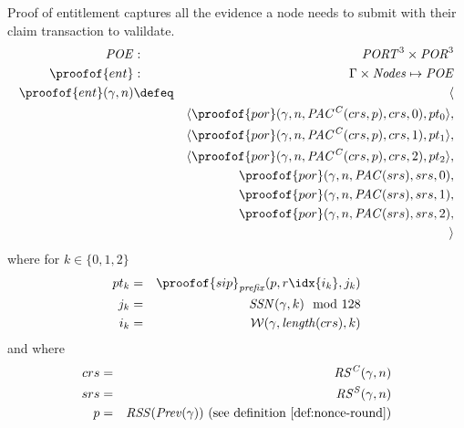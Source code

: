 \begin{definition}
\label{def:poe}
Proof of entitlement captures all the evidence a node needs to submit with their claim transaction to valildate. 
%
\begin{eqnarray}
\mathit{POE}&:&\mathit{PORT}^3\times\mathit{POR}^3\\
\proofof{ent}&:&\Gamma\times\mathit{Nodes}\mapsto\mathit{POE}\\
\proofof{ent}(\gamma,n)&\defeq&\langle\\
&&\langle\proofof{por}(\gamma,n,\mathit{PAC^C}(crs,p), crs,0),pt_0\rangle,\\
&&\langle\proofof{por}(\gamma,n,\mathit{PAC^C}(crs,p),crs,1),pt_1\rangle,\\
&&\langle\proofof{por}(\gamma,n,\mathit{PAC^C}(crs,p),crs,2),pt_2\rangle,\\
&&\proofof{por}(\gamma,n,\mathit{PAC}(srs),srs,0),\\
&&\proofof{por}(\gamma,n,\mathit{PAC}(srs),srs,1),\\
&&\proofof{por}(\gamma,n,\mathit{PAC}(srs),srs,2),\\
&&\rangle
\end{eqnarray}
where for $k\in\{0,1,2\}$
\begin{eqnarray}
pt_k&=& {\proofof{sip}_\mathit{prefix}}(p,r\idx{i_k},j_k)\\
j_k & = & \mathit{SSN}(\gamma,k)\mod 128\\
i_k & = & \mathcal{W}(\gamma,\mathit{length}(crs),k)
\end{eqnarray}
and where 
\begin{eqnarray}
crs& = & \mathit{RS^C}(\gamma, n)\\
srs & = & \mathit{RS^S}(\gamma, n)\\
p & = & \mathit{RSS}(\mathit{Prev}(\gamma)) \text{ (see definition \ref{def:nonce-round})}
\end{eqnarray}
\end{definition}





